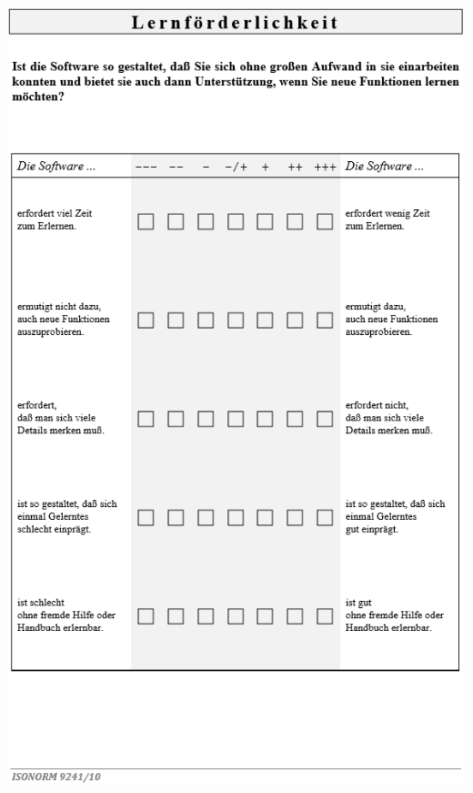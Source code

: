 \bigskip\noindent
\begin{minipage}{\textwidth}
  \centering
  \includegraphics{img/ISO9241-10Fragebogen_S7.PNG}
\end{minipage}